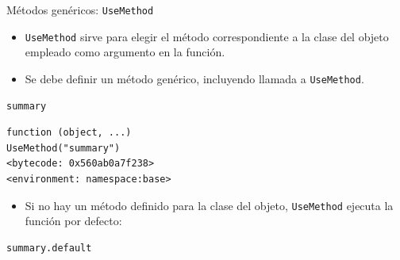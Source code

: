 \documentclass[xcolor={usenames,svgnames,dvipsnames}]{beamer}
\begin{document}
\begin{frame}[label={sec:org53500e3},fragile]{Métodos genéricos: \texttt{UseMethod}}
 \begin{itemize}
\item \texttt{UseMethod} sirve para elegir el método correspondiente a la clase
del objeto empleado como argumento en la función.

\item Se debe definir un método genérico, incluyendo llamada a
\texttt{UseMethod}.
\end{itemize}
\lstset{language=r,label= ,caption= ,captionpos=b,numbers=none}
\begin{lstlisting}
summary
\end{lstlisting}

\begin{verbatim}
function (object, ...) 
UseMethod("summary")
<bytecode: 0x560ab0a7f238>
<environment: namespace:base>
\end{verbatim}


\begin{itemize}
\item Si no hay un método definido para la clase del objeto, \texttt{UseMethod} ejecuta la función por defecto:
\end{itemize}
\lstset{language=r,label= ,caption= ,captionpos=b,numbers=none}
\begin{lstlisting}
summary.default
\end{lstlisting}


\end{frame}
\end{document}
